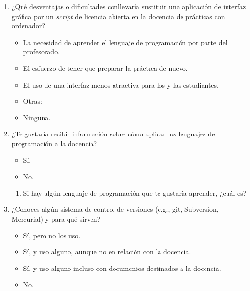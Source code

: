 \documentclass[a4paper,12pt]{article}
\begin{document}
\begin{enumerate}
\item ¿Qué desventajas o dificultades conllevaría sustituir una aplicación de interfaz gráfica por un
   \emph{script} de licencia abierta en la docencia de prácticas con ordenador?
   \begin{itemize}
   \item La necesidad de aprender el lenguaje de programación por parte del profesorado.
   \item El esfuerzo de tener que preparar la práctica de nuevo.
   \item El uso de una interfaz menos atractiva para los y las estudiantes.
   \item Otras:
   \item Ninguna.
   \end{itemize}

\item ¿Te gustaría recibir información sobre cómo aplicar los lenguajes de programación a la
      docencia?
   \begin{itemize}
   \item Sí.
   \item No.
   \end{itemize}

   \begin{enumerate}
   \item Si hay algún lenguaje de programación que te gustaría aprender, ¿cuál es?
   \vspace*{1cm}
   \end{enumerate}

\item ¿Conoces algún sistema de control de versiones (e.g., \textsf{git}, Subversion, Mercurial) y
      para qué sirven?
   \begin{itemize}
   \item Sí, pero no los uso.
   \item Sí, y uso alguno, aunque no en relación con la docencia.
   \item Sí, y uso alguno incluso con documentos destinados a la docencia.
   \item No.
   \end{itemize}


\end{enumerate}
\end{document}
